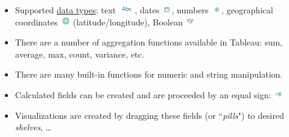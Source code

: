 \documentclass[xcolor=svgnames]{beamer} %
\begin{document}
\begin{frame}
\begin{itemize}
\item Supported \href{https://onlinehelp.tableau.com/current/pro/desktop/en-us/datafields\_typesandroles\_datatypes.htm}{data types}: text \includegraphics[height=1em]{img/text}, dates \includegraphics[height=1em]{img/date}, numbers \includegraphics[height=1em]{img/number}, geographical coordinates \includegraphics[height=1em]{img/global} (latitude/longitude), Boolean \includegraphics[height=1em]{img/truefalse} \vfill

\item  There are a number of aggregation functions available in Tableau: sum, average, max, count, variance, etc.\vfill
\item There are many built-in functions for numeric and string manipulation.\vfill
\item Calculated fields can be created and are proceeded by an equal sign: \includegraphics[height=1em]{img/calculated}\vfill
\item Visualizations are created by dragging these fields (or ``\textit{pills}") to desired \textit{shelves}, \dots 
\vfill
\end{itemize}
\end{frame}
\end{document}
